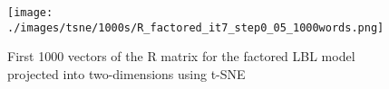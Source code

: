 
\begin{figure}[h]
\texttt{[image: ./images/tsne/1000s/R\_factored\_it7\_step0\_05\_1000words.png]} 
\centering
\caption{First 1000 vectors of the R matrix for the factored LBL model projected into two-dimensions using t-SNE}
\end{figure}
